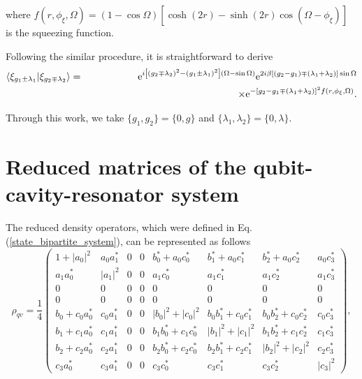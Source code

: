 where $f\left(r, \phi_{\xi}, \Omega\right)
=\left(1-\cos\Omega\right)\left[\cosh\left(2r\right)-\sinh\left(2r\right)
\cos\left(\Omega-\phi_{\xi}\right)\right]$ is the squeezing function.

Following the similar procedure, it is straightforward to derive 
\begin{eqnarray}
\langle \xi_{g_{1}\pm\lambda_{1}}|\xi_{g_{2}\mp\lambda_{2}}\rangle &=&\textrm{e}^{i\left[\left(g_{2}\mp\lambda_{2}\right)^{2}-\left(g_{1}\pm\lambda_{1}\right)^{2}\right]\left(\Omega-\sin \Omega\right)}\textrm{e}^{2i\beta\left[\left(g_{2}-g_{1}\right)\mp\left(\lambda_{1}+\lambda_{2}\right)\right]\sin\Omega}\nonumber\\
                                                                   &&\hspace{5.3cm}\times\textrm{e}^{-\left[g_{2}-g_{1}\mp\left(\lambda_{1}+\lambda_{2}\right)\right]^{2}f\left(r,\phi_{\xi},\Omega\right)}.
\end{eqnarray}

Through this work, we take $\{g_{1},g_{2}\}=\{0,g\}$ and $\{\lambda_{1},\lambda_{2}\}=\{0,\lambda\}$.

\section{Reduced matrices of the qubit-cavity-resonator system}\label{ap2}

The reduced density operators, which were defined in Eq. (\ref{state_bipartite_system}), can be represented as follows
\begin{equation}
\rho_{qv}=\frac{1}{4}
 \begin{pmatrix}
 1+|a_{0}|^{2} & a_{0}a_{1}^{*} & 0 & 0 & b_{0}^{*}+a_{0}c_{0}^{*} & b_{1}^{*}+a_{0}c_{1}^{*} & b_{2}^{*}+a_{0}c_{2}^{*} & a_{0}c_{3}^{*} \\
 a_{1}a_{0}^{*} & |a_{1}|^{2} & 0 & 0 & a_{1}c_{0}^{*} & a_{1}c_{1}^{*} & a_{1}c_{2}^{*} & a_{1}c_{3}^{*} \\
 0 & 0 & 0 & 0 & 0 & 0 & 0 & 0 \\
 0 & 0 & 0 & 0 & 0 & 0 & 0 & 0 \\
 b_{0}+c_{0}a_{0}^{*} & c_{0}a_{1}^{*} & 0 & 0 & |b_{0}|^{2}+|c_{0}|^{2} & b_{0}b_{1}^{*}+c_{0}c_{1}^{*} & b_{0}b_{2}^{*}+c_{0}c_{2}^{*} & c_{0}c_{3}^{*} \\
 b_{1}+c_{1}a_{0}^{*} & c_{1}a_{1}^{*} & 0 & 0 & b_{1}b_{0}^{*}+c_{1}c_{0}^{*} & |b_{1}|^{2}+|c_{1}|^{2} & b_{1}b_{2}^{*}+c_{1}c_{2}^{*} & c_{1}c_{3}^{*}  \\
 b_{2}+c_{2}a_{0}^{*} & c_{2}a_{1}^{*} & 0 & 0 & b_{2}b_{0}^{*}+c_{2}c_{0}^{*} & b_{2}b_{1}^{*}+c_{2}c_{1}^{*} & |b_{2}|^{2}+|c_{2}|^{2} & c_{2}c_{3}^{*}  \\
 c_{3}a_{0}^{*} & c_{3}a_{1}^{*} & 0 & 0 & c_{3}c_{0}^{*} & c_{3}c_{1}^{*} & c_{3}c_{2}^{*} & |c_{3}|^{2} 
 \end{pmatrix},
\end{equation}

